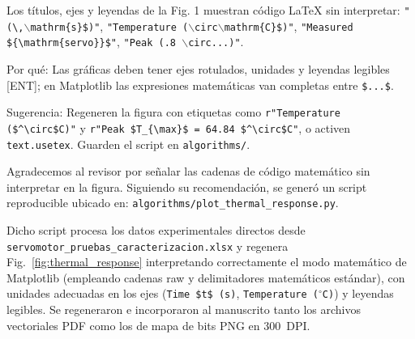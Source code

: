 \documentclass{LabDSTresponse}
\begin{document}
{Los títulos, ejes y leyendas de la Fig. 1 muestran código \LaTeX{} sin interpretar: \texttt{"(\textbackslash,$\backslash$mathrm\{s\}\$)"}, \texttt{"Temperature ($\backslash$circ$\backslash$mathrm\{C\}\$)"}, \texttt{"Measured \$\{\textbackslash mathrm\{servo\}\}\$"}, \texttt{"Peak (.8\,$\backslash$circ...)"}.

Por qué: Las gráficas deben tener ejes rotulados, unidades y leyendas legibles [ENT]; en Matplotlib las expresiones matemáticas van completas entre \texttt{\$...\$}.

Sugerencia: Regeneren la figura con etiquetas como \texttt{r"Temperature (\$\textasciicircum\textbackslash circ\$C)"} y \texttt{r"Peak \$T\_\{\textbackslash max\}\$ = 64.84 \$\textasciicircum\textbackslash circ\$C"}, o activen \texttt{text.usetex}. Guarden el script en \texttt{algorithms/}.}
{Agradecemos al revisor por señalar las cadenas de código matemático sin interpretar en la figura. Siguiendo su recomendación, se generó un script reproducible ubicado en:
\texttt{algorithms/plot\_thermal\_response.py}.

Dicho script procesa los datos experimentales directos desde \texttt{servomotor\_pruebas\_caracterizacion.xlsx} y regenera Fig.~\ref{fig:thermal_response} interpretando correctamente el modo matemático de Matplotlib (empleando cadenas raw y delimitadores matemáticos estándar), con unidades adecuadas en los ejes (\texttt{Time \$t\$ (s)}, \texttt{Temperature ($^\circ$C)}) y leyendas legibles. Se regeneraron e incorporaron al manuscrito tanto los archivos vectoriales PDF como los de mapa de bits PNG en 300~DPI.}
\end{document}
